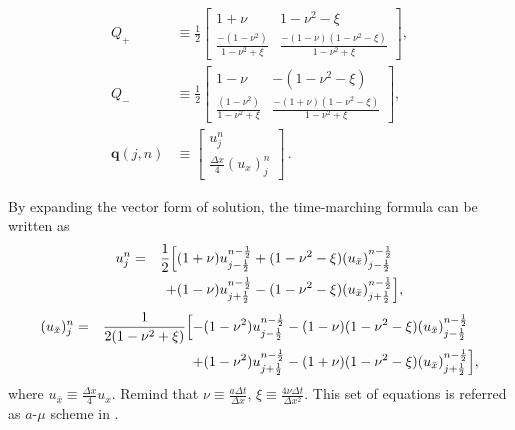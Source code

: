 \documentclass[letterpaper,12pt,dvips]{article}
\renewcommand{\vec}[1]{\mathbf{#1}}
\numberwithin{equation}{section}
\begin{document}
\begin{align*}
  Q_+ &\equiv 
    \frac{1}{2}
    \left[\begin{array}{cc}
      1+\nu                                     & 
      1-\nu^2-\xi                               \\
      \frac{-(1-\nu^2)}{1-\nu^2+\xi}            & 
      \frac{-(1-\nu)(1-\nu^2-\xi)}{1-\nu^2+\xi}
    \end{array}\right], \\
  Q_- &\equiv 
    \frac{1}{2}
    \left[\begin{array}{cc}
      1-\nu                                     & 
      -(1-\nu^2-\xi)                            \\
      \frac{(1-\nu^2)}{1-\nu^2+\xi}             & 
      \frac{-(1+\nu)(1-\nu^2-\xi)}{1-\nu^2+\xi}
    \end{array}\right], \\
  \vec{q}(j,n) &\equiv 
    \left[\begin{array}{c}
      u_j^n \\ \frac{\Delta x}{4}(u_x)_j^n 
    \end{array}\right]\,.
\end{align*}

By expanding the vector form of solution, the time-marching formula can be 
written as
\begin{alignat}{2}
  u_j^n &= &\frac{1}{2}\Big[
    &(1+\nu)u_{j-\frac{1}{2}}^{n-\frac{1}{2}} 
    + (1-\nu^2-\xi)(u_{\bar{x}})_{j-\frac{1}{2}}^{n-\frac{1}{2}} 
    \notag \\
  &&+ &(1-\nu)u_{j+\frac{1}{2}}^{n-\frac{1}{2}}
    - (1-\nu^2-\xi)(u_{\bar{x}})_{j+\frac{1}{2}}^{n-\frac{1}{2}}
           \Big] \label{e:amuu},
\end{alignat}
\begin{alignat}{2}
  (u_{\bar{x}})_j^n &= &\frac{1}{2(1-\nu^2+\xi)}\Big[
    -& (1-\nu^2)u_{j-\frac{1}{2}}^{n-\frac{1}{2}}
    -  (1-\nu)(1-\nu^2-\xi)(u_{\bar{x}})_{j-\frac{1}{2}}^{n-\frac{1}{2}} 
    \notag \\
  &&+& (1-\nu^2)u_{j+\frac{1}{2}}^{n-\frac{1}{2}}
    -  (1+\nu)(1-\nu^2-\xi)(u_{\bar{x}})_{j+\frac{1}{2}}^{n-\frac{1}{2}}
                       \Big] \label{e:amuux}, 
\end{alignat}
where $u_{\bar{x}}\equiv\frac{\Delta x}{4}u_x$.
Remind that $\nu\equiv\frac{a\Delta t}{\Delta x}$, 
$\xi\equiv\frac{4\nu\Delta t}{\Delta x^2}$.
This set of equations is referred as $a$-$\mu$ scheme in 
\cite{b:chang95}.
\end{document}
